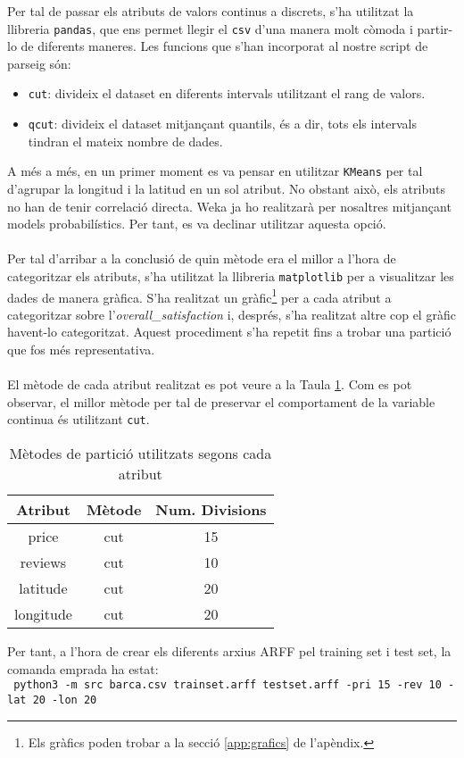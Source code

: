 
\label{sec:partition}

Per tal de passar els atributs de valors continus a discrets, s'ha utilitzat la llibreria \texttt{pandas}, que ens permet llegir el \texttt{csv} d'una manera molt còmoda i partir-lo de diferents maneres. Les funcions que s'han incorporat al nostre script de parseig són:
\begin{itemize}
	\item \texttt{cut}: divideix el dataset en diferents intervals utilitzant el rang de valors.
	\item \texttt{qcut}: divideix el dataset mitjançant quantils, és a dir, tots els intervals tindran el mateix nombre de dades.
\end{itemize}
A més a més, en un primer moment es va pensar en utilitzar \texttt{KMeans} per tal d'agrupar la longitud i la latitud en un sol atribut. No obstant això, els atributs no han de tenir correlació directa. Weka ja ho realitzarà per nosaltres mitjançant models probabilístics. Per tant, es va declinar utilitzar aquesta opció.
\\\\
Per tal d'arribar a la conclusió de quin mètode era el millor a l'hora de categoritzar els atributs, s'ha utilitzat la llibreria \texttt{matplotlib} per a visualitzar les dades de manera gràfica. S'ha realitzat un gràfic\footnote{Els gràfics poden trobar a la secció \ref{app:grafics} de l'apèndix.} per a cada atribut a categoritzar sobre l'\textit{overall\_satisfaction} i, després, s'ha realitzat altre cop el gràfic havent-lo categoritzat. Aquest procediment s'ha repetit fins a trobar una partició que fos més representativa.
\\
\\
El mètode de cada atribut realitzat es pot veure a la Taula \ref{tab:part}. Com es pot observar, el millor mètode per tal de preservar el comportament de la variable continua és utilitzant \texttt{cut}.
\begin{table}[H]
	\centering
	\begin{tabular}{ccc}
		Atribut &Mètode & Num. Divisions\\\hline
		price & cut & 15 \\
		reviews & cut & 10 \\
		latitude & cut & 20 \\
		longitude & cut & 20 \\
	\end{tabular}
	\caption{Mètodes de partició utilitzats segons cada atribut}
	\label{tab:part}
\end{table}
Per tant, a l'hora de crear els diferents arxius ARFF pel training set i test set, la comanda emprada ha estat:\\

\texttt{
python3 -m src barca.csv trainset.arff testset.arff -pri 15 -rev 10 -lat 20 -lon 20
}


